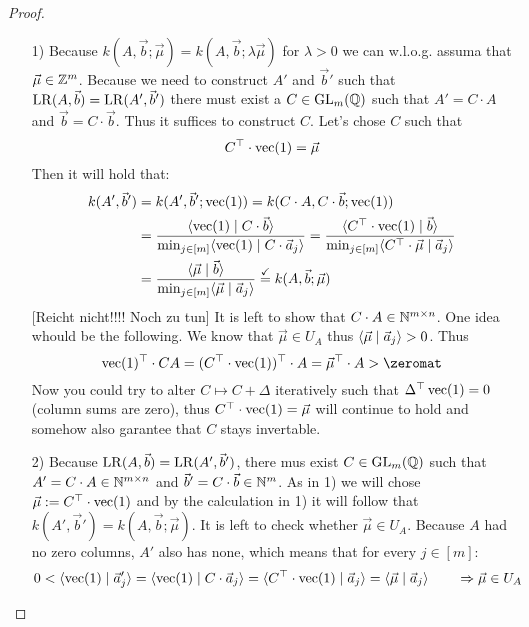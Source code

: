 \begin{proof}
    \begin{enumerate}
        \item[1)] Because $k(A, \vec b; \vec \mu) = k(A, \vec b; \lambda \vec \mu)$ for $\lambda > 0$ we can w.l.o.g. assuma that $\vec \mu \in \mathbb{Z}^m$. Because we need to construct $A'$ and $\vec b'$ such that $\operatorname{LR}(A, \vec b) = \operatorname{LR}(A', \vec b')$ there must exist a $C \in \operatorname{GL}_m(\mathbb{Q})$ such that $A' = C\cdot A$ and $\vec b = C\cdot \vec b$. Thus it suffices to construct $C$. Let's chose $C$ such that
        $$C^\top \cdot \operatorname{vec}(1) = \vec\mu$$
        Then it will hold that:
        \begin{align*}
            k(A', \vec b') &= k(A', \vec b'; \operatorname{vec}(1)) = k(C \cdot A, C \cdot \vec b; \operatorname{vec}(1))\\
            &= \frac{\langle \operatorname{vec}(1) \mid C \cdot \vec b \rangle}{\min_{j \in [m]} \langle \operatorname{vec}(1) \mid C \cdot \vec a_j \rangle} = \frac{\langle C^\top \cdot \operatorname{vec}(1) \mid \vec b \rangle}{\min_{j \in [m]} \langle C^\top \cdot \vec \mu \mid \vec a_j \rangle}\\
            &= \frac{\langle \vec{\mu} \mid \vec b \rangle}{\min_{j \in [m]} \langle \vec \mu \mid \vec a_j \rangle} \stackrel{\checkmark}{=} k(A, \vec b; \vec\mu)
        \end{align*}
        [Reicht nicht!!!! Noch zu tun]
        It is left to show that $C \cdot A \in \mathbb{N}^{m \times n}$. One idea whould be the following. We know that $\vec\mu\in U_A$ thus $\langle \vec \mu \mid \vec a_j \rangle > 0$. Thus
        $$\opvec(1)^\top \cdot CA = (C^\top \cdot \opvec(1))^\top \cdot A = \vec\mu^\top \cdot A > \zeromat$$
        Now you could try to alter $C \mapsto C + \Delta$ iteratively such that $\Delta^\top \operatorname{vec}(1) = 0$ (column sums are zero), thus $C^\top \cdot \operatorname{vec}(1) = \vec\mu$ will continue to hold and somehow also garantee that $C$ stays invertable.
        \item[2)] Because $\operatorname{LR}(A, \vec b) = \operatorname{LR}(A', \vec b')$, there mus exist $C \in \operatorname{GL}_m(\mathbb{Q})$ such that $A' = C \cdot A \in \mathbb{N}^{m \times n}$ and $\vec b' = C \cdot \vec b \in \mathbb{N}^m$. As in 1) we will chose $\vec \mu := C^\top \cdot \operatorname{vec}(1)$ and by the calculation in 1) it will follow that $k(A', \vec b') = k(A, \vec b; \vec\mu)$. It is left to check whether $\vec \mu \in U_A$. Because $A$ had no zero columns, $A'$ also has none, which means that for every $j \in [m]$:
        $$0 < \langle \operatorname{vec}(1) \mid \vec a'_j \rangle = \langle \operatorname{vec}(1) \mid C \cdot \vec a_j \rangle = \langle C^\top \cdot \operatorname{vec}(1) \mid \vec a_j \rangle = \langle \vec \mu \mid \vec a_j \rangle \qquad \Rightarrow\vec \mu \in U_A$$
    \end{enumerate}
\end{proof}

